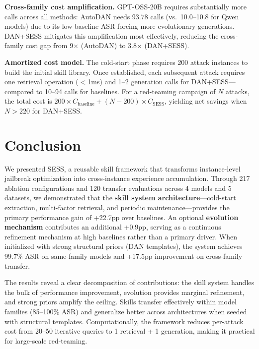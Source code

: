 \documentclass[letterpaper]{article}
\begin{document}
\textbf{Cross-family cost amplification.} GPT-OSS-20B requires substantially more calls across all methods: AutoDAN needs 93.78 calls (vs.\ 10.0--10.8 for Qwen models) due to its low baseline ASR forcing more evolutionary generations. DAN+SESS mitigates this amplification most effectively, reducing the cross-family cost gap from 9$\times$ (AutoDAN) to 3.8$\times$ (DAN+SESS).

\textbf{Amortized cost model.} The cold-start phase requires 200 attack instances to build the initial skill library. Once established, each subsequent attack requires one retrieval operation ($<$1ms) and 1--2 generation calls for DAN+SESS---compared to 10--94 calls for baselines. For a red-teaming campaign of $N$ attacks, the total cost is $200 \times C_{\text{baseline}} + (N - 200) \times C_{\text{SESS}}$, yielding net savings when $N > 220$ for DAN+SESS.

\section{Conclusion}

We presented SESS, a reusable skill framework that transforms instance-level jailbreak optimization into cross-instance experience accumulation. Through 217 ablation configurations and 120 transfer evaluations across 4 models and 5 datasets, we demonstrated that the \textbf{skill system architecture}---cold-start extraction, multi-factor retrieval, and periodic maintenance---provides the primary performance gain of +22.7pp over baselines. An optional \textbf{evolution mechanism} contributes an additional +0.9pp, serving as a continuous refinement mechanism at high baselines rather than a primary driver. When initialized with strong structural priors (DAN templates), the system achieves 99.7\% ASR on same-family models and +17.5pp improvement on cross-family transfer.

The results reveal a clear decomposition of contributions: the skill system handles the bulk of performance improvement, evolution provides marginal refinement, and strong priors amplify the ceiling. Skills transfer effectively within model families (85--100\% ASR) and generalize better across architectures when seeded with structural templates. Computationally, the framework reduces per-attack cost from 20--50 iterative queries to 1 retrieval + 1 generation, making it practical for large-scale red-teaming.
\end{document}
